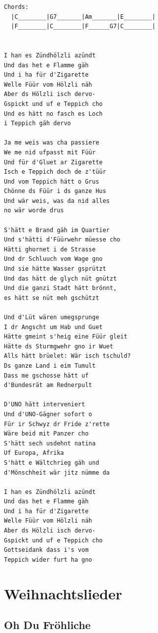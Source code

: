 \documentclass[
]{book}
\let\stdsection\section
\renewcommand\section{\clearpage\stdsection}
\begin{document}
\begin{verbatim}
Chords:
  |C________|G7_______|Am_______|E________|
  |F________|C________|F______G7|C________|


I han es Zündhölzli azündt
Und das het e Flamme gäh
Und i ha für d'Zigarette
Welle Füür vom Hölzli näh
Aber ds Hölzli isch dervo-
Gspickt und uf e Teppich cho
Und es hätt no fasch es Loch 
i Teppich gäh dervo

Ja me weis was cha passiere
We me nid ufpasst mit Füür
Und für d'Gluet ar Zigarette
Isch e Teppich doch de z'tüür
Und vom Teppich hätt o Grus
Chönne ds Füür i ds ganze Hus
Und wär weis, was da nid alles 
no wär worde drus

S'hätt e Brand gäh im Quartier
Und s'hätti d'Füürwehr müesse cho
Hätti ghornet i de Strasse
Und dr Schluuch vom Wage gno
Und sie hätte Wasser gsprützt
Und das hätt de glych nüt gnützt
Und die ganzi Stadt hätt brönnt, 
es hätt se nüt meh gschützt

Und d'Lüt wären umegsprunge
I dr Angscht um Hab und Guet
Hätte gmeint s'heig eine Füür gleit
Hätte ds Sturmgwehr gno ir Wuet
Alls hätt brüelet: Wär isch tschuld?
Ds ganze Land i eim Tumult
Dass me gschosse hätt uf 
d'Bundesrät am Rednerpult

D'UNO hätt interveniert
Und d'UNO-Gägner sofort o
Für ir Schwyz dr Fride z'rette
Wäre beid mit Panzer cho
S'hätt sech usdehnt natina
Uf Europa, Afrika
S'hätt e Wältchrieg gäh und 
d'Mönschheit wär jitz nümme da

I han es Zündhölzli azündt
Und das het e Flamme gäh
Und i ha für d'Zigarette
Welle Füür vom Hölzli näh
Aber ds Hölzli isch dervo-
Gspickt und uf e Teppich cho 
Gottseidank dass i's vom 
Teppich wider furt ha gno
\end{verbatim}

\hypertarget{weihnachtslieder}{%
\chapter{Weihnachtslieder}\label{weihnachtslieder}}

\hypertarget{weihnachten-oh-du-froehliche}{%
\section{Oh Du Fröhliche}\label{weihnachten-oh-du-froehliche}}
\end{document}
